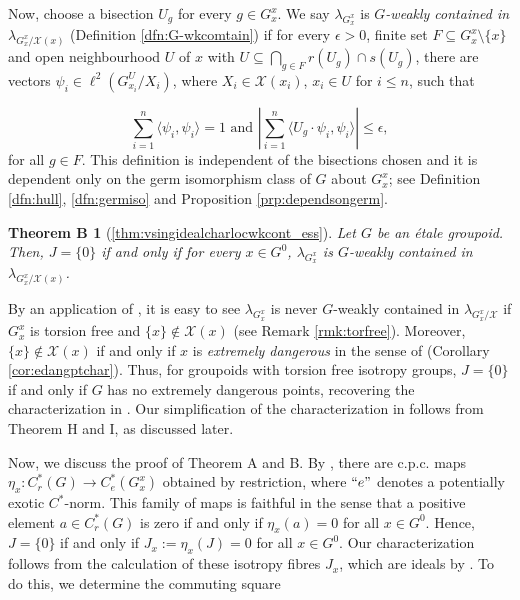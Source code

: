 \documentclass[a4paper, 12pt]{amsart}
\newtheorem*{thmB}{Theorem B}
\theoremstyle{definition}
\theoremstyle{remark}
\numberwithin{equation}{section}
\begin{document}
Now, choose a bisection $U_{g}$ for every $g\in G^{x}_{x}$. We say $\lambda_{G^{x}_{x}}$ is \emph{$G$-weakly contained in $\lambda_{G^{x}_{x}/\mathcal{X}(x)}$} (Definition \ref{dfn:G-wkcomtain}) if for every $\epsilon > 0$, finite set $F\subseteq G^{x}_{x}\setminus \{x\}$ and open neighbourhood $U$ of $x$ with $U\subseteq \bigcap_{g\in F}r(U_{g})\cap s(U_{g})$, there are vectors $\psi_{i}\in \ell^{2}(G^{U}_{x_{i}}/X_{i})$, where $X_{i}\in\mathcal{X}(x_{i})$, $x_{i}\in U$ for $i\leq n$, such that 

    $$\sum^{n}_{i=1}\langle \psi_{i}, \psi_{i}\rangle = 1\text{ and }|\sum^{n}_{i=1}\langle U_{g}\cdot\psi_{i},\psi_{i}\rangle|\leq\epsilon,$$ for all $g\in F$.
This definition is independent of the bisections chosen and it
is dependent only on the germ isomorphism class of $G$ about $G^{x}_{x}$; see Definition \ref{dfn:hull}, \ref{dfn:germiso} and Proposition \ref{prp:dependsongerm}.


\begin{thmB}[\ref{thm:vsingidealcharlocwkcont_ess}]
    Let $G$ be an \'etale groupoid. Then, $J = \{0\}$ if and only if for every $x\in G^{0}$, $\lambda_{G^{x}_{x}}$ is $G$-weakly contained in $\lambda_{G^{x}_{x}/\mathcal{X}(x)}$.
\end{thmB}
By an application of \cite[Lemma~1.9]{NS23}, it is easy to see  $\lambda_{G^{x}_{x}}$ is never $G$-weakly contained in $\lambda_{G^{x}_{x}/\mathcal{X}}$ if $G^{x}_{x}$ is torsion free and $\{x\}\notin \mathcal{X}(x)$ (see Remark \ref{rmk:torfree}). Moreover, $\{x\}\notin \mathcal{X}(x)$ if and only if $x$ is \emph{extremely dangerous} in the sense of \cite{NS23} (Corollary \ref{cor:edangptchar}). Thus, for groupoids with torsion free isotropy groups, $J=\{0\}$ if and only if $G$ has no extremely dangerous points, recovering the characterization in \cite{NS23}. Our simplification of the characterization in \cite{BGHL25} follows from Theorem H and I, as discussed later.

Now, we discuss the proof of Theorem A and B. By \cite{CN22}, there are c.p.c. maps $\eta_{x}:C^{*}_{r}(G)\to C^{*}_{e}(G^{x}_{x})$ obtained by restriction, where $``e"$ denotes a potentially exotic $C^{*}$-norm. This family of maps is faithful in the sense that a positive element $a\in C^{*}_{r}(G)$ is zero if and only if $\eta_{x}(a) = 0$ for all $x\in G^{0}$. Hence, $J = \{0\}$  if and only if $J_{x}:= \eta_{x}(J) = 0$ for all $x\in G^{0}$. Our characterization follows from 
the calculation of these isotropy fibres $J_{x}$, which are ideals by \cite{CN24}. To do this, we determine the commuting square 
\end{document}
